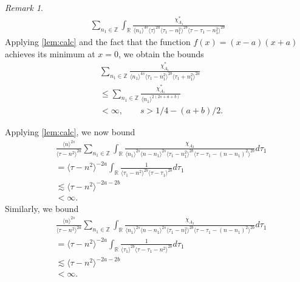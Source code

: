 \documentclass[12pt,reqno]{amsart}
\numberwithin{equation}{section}  %
\numberwithin{figure}{section}
\newcommand{\rr}{\mathbb{R}}
\newcommand{\zz}{\mathbb{Z}}
\theoremstyle{plain}
\theoremstyle{definition}
\theoremstyle{remark}
\newtheorem{remark}{Remark}
\begin{document}
\begin{framed}
\begin{remark}
\begin{equation*}
\begin{split}
  \sum_{n_{1} \in \zz} \int_{\rr} \frac{\chi^{*}_{A_{1}}}{\langle n_{1} \rangle
  ^{4s} \langle \tau \rangle ^{2a} \langle \tau_{1} - n_{1}^{2} \rangle
  ^{2b} \langle \tau - \tau_{1} - n_{1}^{2} \rangle ^{2b}}
\end{split}
\end{equation*}
Applying \autoref{lem:calc} and the fact that the function $f(x) =
(x-a)(x+a)$ achieves its minimum at $x=0$, we obtain the bounds
%
%
\begin{equation*}
\begin{split}
  & \sum_{n_{1} \in \zz} \frac{\chi^{*}_{A_{1}}}{\langle n_{1} \rangle ^{4s} \langle
  \tau_{1} - n_{1}^{2} \rangle ^{2b} \langle \tau_{1} + n_{1}^{2} \rangle
  ^{2a}}
  \\
  & \le \sum_{n_{1} \in \zz}  \frac{\chi_{A_{1}}^{*}}{\langle n_{1} \rangle
  ^{2(2s + a + b)}}
  \\
  & < \infty, \qquad s > 1/4 - (a + b)/2.
\end{split}
\end{equation*}
%
%
\end{remark}
\end{framed}
%
Applying \autoref{lem:calc}, we now bound 
\begin{equation*}
  \begin{split}
    & \frac{ \langle n
    \rangle ^{2s}}{\langle \tau - n^{2} \rangle ^{2a}}
    \sum_{n_{1} \in \zz} \int_{\rr} \frac{\chi_{A_{2}}}{ \langle n_{1} \rangle ^{2s} \langle n-n_{1} \rangle ^{2s} 
    \langle \tau_{1} - n_{1}^{2} \rangle^{2b} \langle  \tau - \tau_{1} -
    (n - n_{1})^{2} \rangle^{2b} }
    d \tau_1 
    \\
    & = 
   \langle \tau -n^{2} \rangle ^{-2a}\int_{\rr} \frac{1}{\langle \tau_{1} -
  n^{2} \rangle ^{2b}\langle
  \tau - \tau_{1}\rangle ^{2b}}d \tau_{1}
  \\
  & \lesssim 
  \langle \tau - n^{2} \rangle ^{-2a-2b} 
  \\
  & < \infty.
\end{split}
\end{equation*}
%
%
Similarly, we bound
%
%
\begin{equation}
\begin{split}
  & \frac{ \langle n
    \rangle ^{2s}}{\langle \tau - n^{2} \rangle ^{2a}}
    \sum_{n_{1} \in \zz} \int_{\rr} \frac{\chi_{A_{3}}}{ \langle n_{1} \rangle ^{2s} \langle n-n_{1} \rangle ^{2s} 
    \langle \tau_{1} - n_{1}^{2} \rangle^{2b} \langle  \tau - \tau_{1} -
    (n - n_{1})^{2} \rangle^{2b} }
    d \tau_1 
    \\
  & = \langle \tau - n^{2} \rangle ^{-2a}
  \int_{\rr} \frac{1}{ \langle \tau_{1} \rangle^{2b}  \langle \tau -
  \tau_{1} - n^{2} \rangle^{2b}}
d \tau_1 
\\
  & \lesssim   \langle \tau - n^{2} \rangle ^{-2a-2b} 
  \\
  & < \infty.
	\end{split}
\end{equation}
\end{document}
